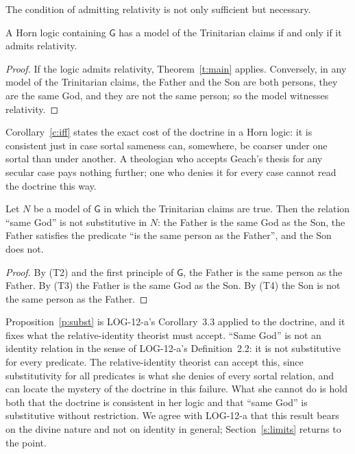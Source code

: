 \documentclass{situationist-preprint}
\begin{document}
The condition of admitting relativity is not only sufficient but necessary.

\begin{corollary}\label{c:iff}
A Horn logic containing $\mathsf{G}$ has a model of the Trinitarian claims if and only if it admits relativity.
\end{corollary}

\begin{proof}
If the logic admits relativity, Theorem~\ref{t:main} applies. Conversely, in any model of the Trinitarian claims, the Father and the Son are both persons, they are the same God, and they are not the same person; so the model witnesses relativity.
\end{proof}

Corollary~\ref{c:iff} states the exact cost of the doctrine in a Horn logic: it is consistent just in case sortal sameness can, somewhere, be coarser under one sortal than under another. A theologian who accepts Geach's thesis for any secular case pays nothing further; one who denies it for every case cannot read the doctrine this way.

\begin{proposition}\label{p:subst}
Let $N$ be a model of $\mathsf{G}$ in which the Trinitarian claims are true. Then the relation \enquote{same God} is not substitutive in $N$: the Father is the same God as the Son, the Father satisfies the predicate \enquote{is the same person as the Father}, and the Son does not.
\end{proposition}

\begin{proof}
By (T2) and the first principle of $\mathsf{G}$, the Father is the same person as the Father. By (T3) the Father is the same God as the Son. By (T4) the Son is not the same person as the Father.
\end{proof}

Proposition~\ref{p:subst} is LOG-12-a's Corollary~3.3 applied to the doctrine, and it fixes what the relative-identity theorist must accept. \enquote{Same God} is not an identity relation in the sense of LOG-12-a's Definition~2.2: it is not substitutive for every predicate. The relative-identity theorist can accept this, since substitutivity for all predicates is what she denies of every sortal relation, and can locate the mystery of the doctrine in this failure. What she cannot do is hold both that the doctrine is consistent in her logic and that \enquote{same God} is substitutive without restriction. We agree with LOG-12-a that this result bears on the divine nature and not on identity in general; Section~\ref{s:limits} returns to the point.
\end{document}
